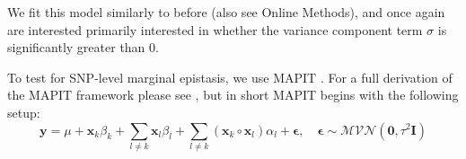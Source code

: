 \documentclass[12pt,a4paper]{article}
\begin{document}
We fit this model similarly to before (also see Online Methods), and once again are interested primarily interested in whether the variance component term $\sigma$ is significantly greater than 0.






















To test for SNP-level marginal epistasis, we use MAPIT \citep{Crawford2017}. For a full derivation of the MAPIT framework please see \citet{Crawford2017}, but in short MAPIT begins with the following setup:
\begin{equation}
\textbf{y} = \mu + \textbf{x}_k\beta_k + \sum_{l \neq k} \textbf{x}_l\beta_l + \sum_{l \neq k} (\textbf{x}_k \circ \textbf{x}_l)\alpha_l + \boldsymbol{\epsilon}, \quad \boldsymbol{\epsilon} \sim \mathcal{MVN}(\textbf{0}, \tau^{2}\textbf{I})  
\end{equation}
\end{document}
